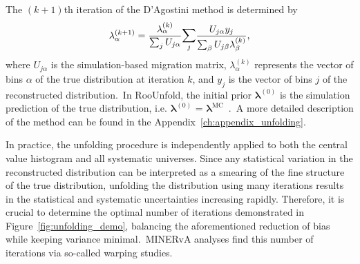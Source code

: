 The $(k+1)$th iteration of the D'Agostini method is determined by 
\vspace{-10pt}
\begin{equation}
    \label{eq:unfolding}
    \vspace{10pt}
    \lambda_{\alpha}^{(k+1)} = \frac{\lambda_{\alpha}^{(k)}}{\sum_{j} U_{j\alpha}} \mathlarger{\sum}_{j} \frac{U_{j\alpha}y_j}{\sum_{\beta} U_{j\beta}\lambda_{\beta}^{(k)}},
\end{equation}
where $U_{j\alpha}$ is the simulation-based migration matrix, $\lambda_{\alpha}^{(k)}$ represents the vector of bins $\alpha$ of the true distribution at iteration $k$, and $y_{j}$ is the vector of bins $j$ of the reconstructed distribution.~In RooUnfold, the initial prior $\boldsymbol{\lambda}^{(0)}$ is the simulation prediction of the true distribution, i.e. $\boldsymbol{\lambda}^{(0)}$ = $\boldsymbol{\lambda}^{\text{MC}}$~\cite{Adye:2011gm}.~A more detailed description of the method can be found in the Appendix~\ref{ch:appendix_unfolding}.

In practice, the unfolding procedure is independently applied to both the central value histogram and all systematic universes. Since any statistical variation in the reconstructed distribution can be interpreted as a smearing of the fine structure of the true distribution, unfolding the distribution using many iterations results in the statistical and systematic uncertainties increasing rapidly. Therefore, it is crucial to determine the optimal number of iterations demonstrated in Figure~\ref{fig:unfolding_demo}, balancing the aforementioned reduction of bias while keeping variance minimal.~MINERvA analyses find this number of iterations via so-called warping studies.

